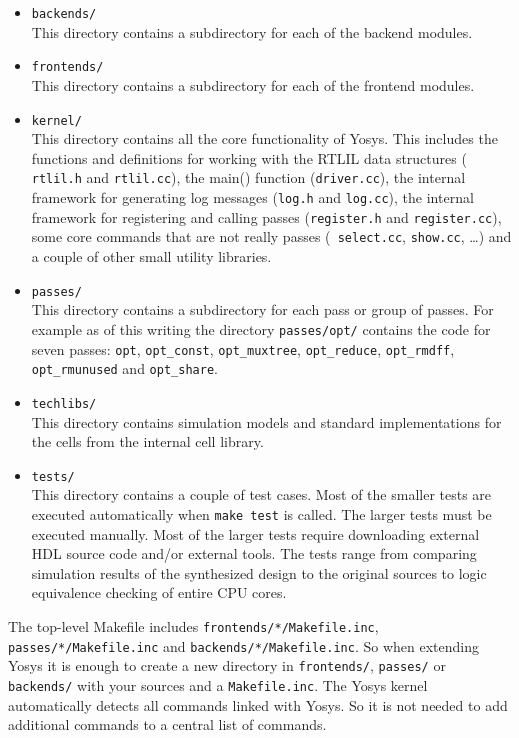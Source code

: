 \begin{itemize}

\item {\tt backends/} \\
This directory contains a subdirectory for each of the backend modules.

\item {\tt frontends/} \\
This directory contains a subdirectory for each of the frontend modules.

\item {\tt kernel/} \\
This directory contains all the core functionality of Yosys. This includes the
functions and definitions for working with the RTLIL data structures ({\tt
rtlil.h} and {\tt rtlil.cc}), the main() function ({\tt driver.cc}), the
internal framework for generating log messages ({\tt log.h} and {\tt log.cc}),
the internal framework for registering and calling passes ({\tt register.h} and
{\tt register.cc}), some core commands that are not really passes ({\tt
select.cc}, {\tt show.cc}, \dots) and a couple of other small utility libraries.

\item {\tt passes/} \\
This directory contains a subdirectory for each pass or group of passes. For example as
of this writing the directory {\tt passes/opt/} contains the code for seven
passes: {\tt opt}, {\tt opt\_const}, {\tt opt\_muxtree}, {\tt opt\_reduce},
{\tt opt\_rmdff}, {\tt opt\_rmunused} and {\tt opt\_share}.

\item {\tt techlibs/} \\
This directory contains simulation models and standard implementations for the
cells from the internal cell library.

\item {\tt tests/} \\
This directory contains a couple of test cases. Most of the smaller tests are executed
automatically when {\tt make test} is called. The larger tests must be executed
manually. Most of the larger tests require downloading external HDL source code
and/or external tools. The tests range from comparing simulation results of the synthesized
design to the original sources to logic equivalence checking of entire CPU cores.

\end{itemize}

\begin{sloppypar}
The top-level Makefile includes {\tt frontends/*/Makefile.inc}, {\tt passes/*/Makefile.inc}
and {\tt backends/*/Makefile.inc}. So when extending Yosys it is enough to create
a new directory in {\tt frontends/}, {\tt passes/} or {\tt backends/} with your sources
and a {\tt Makefile.inc}. The Yosys kernel automatically detects all commands linked with
Yosys. So it is not needed to add additional commands to a central list of commands.
\end{sloppypar}

